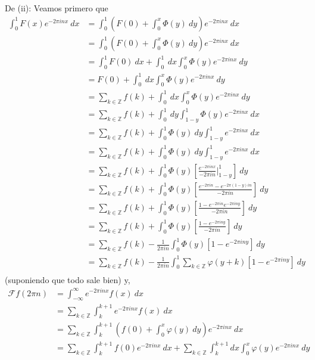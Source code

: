 \documentclass[12pt]{report}
\newcounter{it}
\theoremstyle{largebreak}
\newcommand{\fou}[1]{\ensuremath{\mathcal{F}#1}}
\begin{document}
\begin{sol}
        De (ii): Veamos primero que
        \begin{equation*}
            \begin{split}
                \int_0^1 F(x)e^{ -2\pi inx}\:dx&=\int_0^1\left(F(0)+\int_0^x\Phi(y)\:dy\right)e^{ -2\pi inx}\:dx \\
                &=\int_0^1\left(F(0)+\int_0^x\Phi(y)\:dy\right)e^{ -2\pi inx}\:dx \\
                &=\int_0^1 F(0)\:dx+\int_0^1\:dx\int_0^x\Phi(y) e^{ -2\pi inx}\:dy \\
                &=F(0)+\int_0^1\:dx\int_0^x\Phi(y) e^{ -2\pi inx}\:dy\\
                &=\sum_{k\in\mathbb{Z}}f(k)+\int_0^1\:dx\int_0^x\Phi(y) e^{ -2\pi inx}\:dy\\
                &=\sum_{k\in\mathbb{Z}}f(k)+\int_0^1\:dy\int_{1-y}^1\Phi(y) e^{ -2\pi inx}\:dx\\
                &=\sum_{k\in\mathbb{Z}}f(k)+\int_0^1\Phi(y)\:dy\int_{1-y}^1 e^{ -2\pi inx}\:dx\\
                &=\sum_{k\in\mathbb{Z}}f(k)+\int_0^1\Phi(y)\:dy\int_{1-y}^1 e^{ -2\pi inx}\:dx\\
                &=\sum_{k\in\mathbb{Z}}f(k)+\int_0^1\Phi(y)\left[\frac{e^{ -2\pi inx}}{-2\pi in}\Big|_{1-y}^1\right]\:dy\\
                &=\sum_{k\in\mathbb{Z}}f(k)+\int_0^1\Phi(y)\left[\frac{e^{ -2\pi in}-e^{ -2\pi(1-y)in}}{-2\pi in}\right]\:dy\\
                &=\sum_{k\in\mathbb{Z}}f(k)+\int_0^1\Phi(y)\left[\frac{1-e^{ -2\pi in}e^{ -2\pi iny}}{-2\pi in}\right]\:dy\\
                &=\sum_{k\in\mathbb{Z}}f(k)+\int_0^1\Phi(y)\left[\frac{1-e^{ -2\pi iny}}{-2\pi in}\right]\:dy\\
                &=\sum_{k\in\mathbb{Z}}f(k)-\frac{1}{2\pi in}\int_0^1\Phi(y)\left[1-e^{-2\pi iny}\right]\:dy\\
                &=\sum_{k\in\mathbb{Z}}f(k)-\frac{1}{2\pi in}\int_0^1\sum_{ k\in\mathbb{Z}}\varphi(y+k)\left[1-e^{-2\pi iny}\right]\:dy\\
            \end{split}
        \end{equation*}
        (suponiendo que todo sale bien) y,
        \begin{equation*}
            \begin{split}
                \fou{f}(2\pi n)&=\int_{-\infty}^{\infty}e^{ -2\pi inx}f(x)\:dx\\
                &=\sum_{ k\in\mathbb{Z}}\int_{k}^{k+1}e^{ -2\pi inx}f(x)\:dx\\
                &=\sum_{ k\in\mathbb{Z}}\int_{k}^{k+1}\left(f(0)+\int_0^x\varphi(y)\:dy\right) e^{ -2\pi inx} \:dx\\
                &=\sum_{ k\in\mathbb{Z}}\int_{k}^{k+1}f(0)e^{ -2\pi inx}\:dx+\sum_{ k\in\mathbb{Z}}\int_{k}^{k+1}dx\int_0^x \varphi(y)e^{-2\pi inx}\:dy
            \end{split}
        \end{equation*}


\end{sol}
\end{document}
